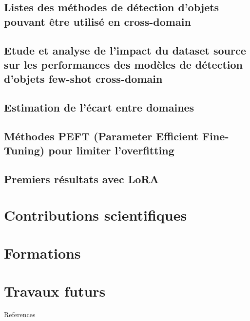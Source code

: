 \documentclass[xcolor=table, 8pt]{beamer}
\begin{document}
    \subsection{Listes des méthodes de détection d'objets pouvant être utilisé en cross-domain}\label{subsec:fs-od-cd-sota}
    

    \subsection{Etude et analyse de l'impact du dataset source sur les performances des modèles de détection d'objets few-shot cross-domain}\label{subsec:srcdata}
    


    \subsection{Estimation de l'écart entre domaines}\label{subsec:results-variances}
    
    
    
    

    \subsection{Méthodes PEFT (Parameter Efficient Fine-Tuning) pour limiter l'overfitting}\label{sec:peft}
    
    

    \subsection{Premiers résultats avec LoRA}\label{subsec:results-loracurves}
    




    \section{Contributions scientifiques}\label{subsec:approach-publications}
    

    \section{Formations}\label{subsec:formations}
    

    \section{Travaux futurs}\label{subsec:approach-future-work}
    



    \begin{frame}[allowframebreaks=]{References}
        \printbibliography
    \end{frame}
\end{document}
